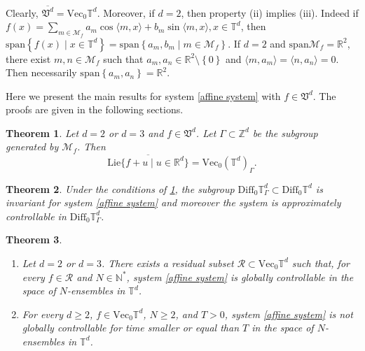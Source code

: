 \documentclass[10pt]{article}
\newcommand{\R}{{\mathbb R}}
\newcommand{\T}{{\mathbb T}}
\newcommand{\N}{{\mathbb N}}
\newcommand{\Z}{{\mathbb Z}}
\newcommand{\M}{{\mathcal M}}
\newcommand{\la}{\langle}
\newcommand{\ra}{\rangle}
\newtheorem{theorem}{Theorem}
\begin{document}
Clearly, $\overline{\mathfrak V^d}=\mathrm{Vec}_0\T^d$. Moreover, if $d=2$, then property (ii) implies (iii). Indeed if $f(x)=\sum_{m\in \M_f}a_m \cos \la m,x \ra+b_m \sin \la m,x\ra,x\in \T^d$, then $\mathrm{span}\left\{f(x)\mid x \in \T^d\right\}=\mathrm{span}\left\{a_m,b_m \mid m \in \M_f\right\}$. If $d=2$ and $\mathrm{span }\M_f=\R^2$, there exist $m,n \in \M_f$ such that $a_m,a_n\in \R^2\setminus \left\{0\right\}$ and $\la m,a_m\ra=\la n,a_n \ra=0$. Then necessarily $\mathrm{span}\left\{a_m,a_n\right\}=\R^2$.

Here we present the main results for system \eqref{affine system} with $f\in \mathfrak{V}^d$. The proofs are given in the following sections.

\begin{theorem} \label{theorem : Lie algebra T2 and T3}
Let $d=2$ or $d=3$ and $f\in\mathfrak V^d$. Let $\Gamma\subset\Z^d$ be the subgroup generated by $\M_f$. Then 
\begin{equation*}
    \overline{\mathrm{Lie}\{f+u \mid u\in\R^d\}}=\mathrm{Vec}_0(\T^d)_\Gamma.
\end{equation*}

\end{theorem}

\begin{theorem} \label{theorem : affine system approx diffeo}
Under the conditions of \cref{theorem : Lie algebra T2 and T3}, the subgroup $\mathrm{Diff}_0\T^d_\Gamma\subset\mathrm{Diff}_0\T^d$ is invariant
for system \eqref{affine system} and moreover the system is approximately controllable in $\mathrm{Diff}_0\T^d_\Gamma$.
\end{theorem}

\begin{theorem} \label{theorem : affine system ensemble controllability}
\begin{enumerate}
    \item[(i)] Let $d=2$ or $d=3$. There exists a residual subset $\mathcal R\subset\mathrm{Vec}_0\T^d$ such that, for every $f\in\mathcal R$ and $N\in \N^*$, system \eqref{affine system}
is globally controllable in the space of $N$-ensembles in $\T^d$.
\item[(ii)] For every $d\ge 2$, $f\in\mathrm{Vec}_0\T^d$, $N\ge 2$, and $T>0$, system \eqref{affine system} is not globally controllable 
for time smaller or equal than $T$ in the space of $N$-ensembles in $\T^d$.
\end{enumerate}   
\end{theorem}
\end{document}
